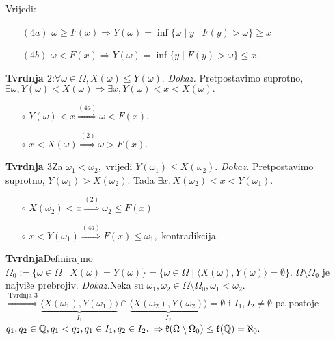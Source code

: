 \documentclass{article}
\begin{document}
Vrijedi: 
\begin{enumerate}
    \item[\((4a)\)] \(\omega\ge F(x)\Rightarrow Y(\omega)=\inf\{\omega\mid y\mid F(y)>\omega\}\ge x\)
    \item[\((4b)\)] \(\omega<F(x)\Rightarrow Y(\omega)=\inf\{y\mid F(y)>\omega\}\le x.\)
\end{enumerate}
\textbf{Tvrdnja \(2\)}:\newline \(\forall \omega\in\Omega, X(\omega)\le Y(\omega).\)\newline\newline
\textit{Dokaz.}\newline
Pretpostavimo suprotno, \(\exists\omega, Y(\omega)<X(\omega)\Rightarrow\exists x, Y(\omega)<x<X(\omega).\)
\begin{enumerate}
    \item[\(\circ\)] \(Y(\omega)<x\overset{(4a)}{\Rightarrow}\omega<F(x),\) 
    \item[\(\circ\)] \(x<X(\omega)\overset{(2)}{\Rightarrow}\omega>F(x).\)
\end{enumerate}
\textbf{Tvrdnja \(3\)}\newline Za \(\omega_1<\omega_2,\) vrijedi \(Y(\omega_1)\le X(\omega_2).\)\newline\newline
\textit{Dokaz.}\newline
Pretpostavimo suprotno, \(Y(\omega_1)>X(\omega_2).\) Tada \(\exists x, X(\omega_2)<x<Y(\omega_1).\)
\begin{itemize}
    \item[\(\circ\)] \(X(\omega_2)<x\overset{(2)}{\Rightarrow}\omega_2\le F(x)\)
    \item[\(\circ\)] \(x<Y(\omega_1)\overset{(4a)}{\Rightarrow} F(x)\le\omega_1,\) kontradikcija.
\end{itemize}
\textbf{Tvrdnja}\newline Definirajmo \(\Omega_0:=\{\omega\in\Omega\mid X(\omega)=Y(\omega)\}=\{\omega\in\Omega\mid\langle X(\omega),Y(\omega)\rangle=\emptyset\}.\) \(\Omega\setminus\Omega_0\) je najviše prebrojiv.\newline\newline
\textit{Dokaz.}\newline Neka su \(\omega_1,\omega_2\in\Omega\setminus\Omega_0,\omega_1<\omega_2.\) \(\overset{\text{Tvrdnja }3}{\Rightarrow}\underbrace{\langle X(\omega_1),Y(\omega_1)\rangle}_{I_1}\cap\underbrace{\langle X(\omega_2),Y(\omega_2)\rangle}_{I_2}=\emptyset\) i \(I_1,I_2\ne\emptyset\) pa postoje \(q_1,q_2\in\Bbb Q,q_1<q_2, q_1\in I_1,q_2\in I_2.\) \(\Rightarrow\mathfrak k(\Omega\setminus\Omega_0)\le\mathfrak k(\Bbb Q)=\aleph_0.\)\newline\newline
\end{document}
